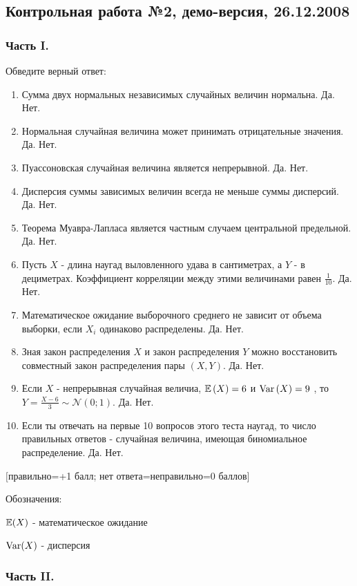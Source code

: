 \documentclass[12pt, a4paper]{article}\usepackage[]{graphicx}\usepackage[]{color}
\begin{document}
\subsection{Контрольная работа №2, демо-версия, 26.12.2008}

\subsubsection*{Часть I.}

Обведите верный ответ:

\begin{enumerate}
\item Сумма двух нормальных независимых случайных величин нормальна.
Да. Нет.
\item Нормальная случайная величина может принимать отрицательные
значения. Да. Нет.
\item Пуассоновская случайная величина является непрерывной. Да. Нет.
\item Дисперсия суммы зависимых величин всегда не меньше суммы
дисперсий. Да. Нет.
\item Теорема Муавра-Лапласа является частным случаем центральной
предельной. Да. Нет.
\item Пусть $X$ - длина наугад выловленного удава в сантиметрах, а
$Y$ - в дециметрах. Коэффициент корреляции между этими
величинами равен $\frac{1}{10}$. Да. Нет.
\item Математическое ожидание выборочного среднего не зависит от
объема выборки, если $X_{i}$ одинаково распределены. Да. Нет.
\item Зная закон распределения $X$ и закон распределения $Y$
можно восстановить совместный закон распределения пары $(X,Y)$. Да. Нет.
\item Если  $X$  - непрерывная случайная величиа,  $\mathbb{E}\left(X\right)=6$  и
$\operatorname{Var}\left(X\right)=9$ , то  $Y=\frac{X-6}{3} \sim
\mathcal{N}\left(0;1\right)$.  Да. Нет.
\item Если ты отвечать на первые 10 вопросов этого теста наугад, то
число правильных ответов - случайная величина, имеющая
биномиальное распределение. Да. Нет.
\end{enumerate}


$[$правильно=+1 балл; нет ответа=неправильно=0 баллов$]$

Обозначения:

$\mathbb{E}(X)$ - математическое ожидание

$\operatorname{Var}(X)$ - дисперсия

\subsubsection*{Часть II.}
\end{document}
